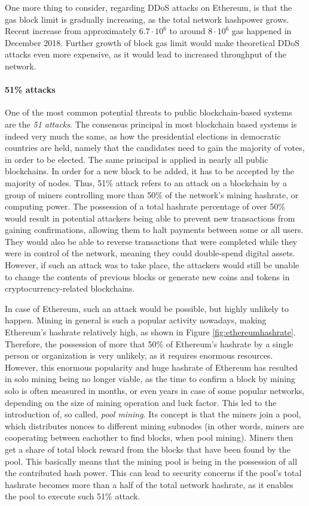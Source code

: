 One more thing to consider, regarding DDoS attacks on Ethereum, is that the gas block limit is gradually increasing, as the total network hashpower grows. Recent increase from approximately $6.7 \cdot 10^6$ to around $8 \cdot 10^6$ gas happened in December 2018. Further growth of block gas limit would make theoretical DDoS attacks even more expensive, as it would lead to increased throughput of the network.

\paragraph{51\% attacks}
One of the most common potential threats to public blockchain-based systems are the \textit{\glspl{51 attack}}. The consensus principal in most blockchain based systems is indeed very much the same, as how the presidential elections in democratic countries are held, namely that the candidates need to gain the majority of votes, in order to be elected. The same principal is applied in nearly all public blockchains. In order for a new block to be added, it has to be accepted by the majority of nodes. Thus, 51\% attack refers to an attack on a blockchain by a group of miners controlling more than 50\% of the network's mining hashrate, or computing power. The possession of a total hashrate percentage of over 50\% would result in potential attackers being able to prevent new transactions from gaining confirmations, allowing them to halt payments between some or all users. They would also be able to reverse transactions that were completed while they were in control of the network, meaning they could double-spend digital assets. However, if such an attack was to take place, the attackers would still be unable to change the contents of previous blocks or generate new coins and tokens in cryptocurrency-related blockchains.

In case of Ethereum, such an attack would be possible, but highly unlikely to happen. Mining in general is such a popular activity nowadays, making Ethereum's hashrate relatively high, as shown in Figure \ref{fig:ethereumhashrate}. Therefore, the possession of more that 50\% of Ethereum's hashrate by a single person or organization is very unlikely, as it requires enormous resources. However, this enormous popularity and huge hashrate of Ethereum has resulted in solo mining being no longer viable, as the time to confirm a block by mining solo is often measured in months, or even years in case of some popular networks, depending on the size of mining operation and luck factor. This led to the introduction of, so called, \textit{\gls{pool mining}}. Its concept is that the miners join a pool, which distributes nonces to different mining subnodes (in other words, miners are cooperating between eachother to find blocks, when pool mining). Miners then get a share of total block reward from the blocks that have been found by the pool. This basically means that the mining pool is being in the possession of all the contributed hash power. This can lead to security concerns if the pool's total hashrate becomes more than a half of the total network hashrate, as it enables the pool to execute such 51\% attack.

